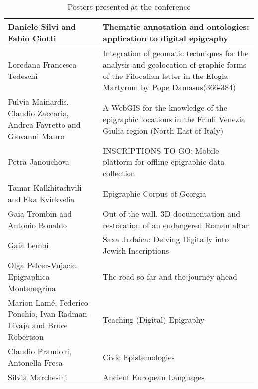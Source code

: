 \begin{table}
{\begin{tabular*}{\textwidth}{p{4.5cm}|p{6cm}}
Daniele Silvi and Fabio Ciotti & Thematic annotation and ontologies: application to digital epigraphy\\\hline
Loredana Francesca Tedeschi & Integration of geomatic techniques for the analysis and geolocation of graphic forms of the Filocalian letter in the Elogia Martyrum by Pope Damasus(366-384)\\\hline
Fulvia Mainardis, Claudio Zaccaria, Andrea Favretto and Giovanni Mauro & A WebGIS for the knowledge of the epigraphic locations in the Friuli Venezia Giulia region (North-East of Italy)\\\hline
Petra Janouchova & INSCRIPTIONS TO GO: Mobile platform for offline epigraphic data collection\\\hline
Tamar Kalkhitashvili and Eka Kvirkvelia & Epigraphic Corpus of Georgia\\\hline
Gaia Trombin and Antonio Bonaldo & Out of the wall. 3D documentation and restoration of an endangered Roman altar\\\hline
Gaia Lembi & Saxa Judaica: Delving Digitally into Jewish Inscriptions\\\hline
Olga Pelcer-Vujacic. Epigraphica Montenegrina & The road so far and the journey ahead\\\hline
Marion Lamé, Federico Ponchio, Ivan Radman-Livaja and Bruce Robertson & Teaching (Digital) Epigraphy\\\hline
Claudio Prandoni, Antonella Fresa & Civic Epistemologies \\\hline
Silvia Marchesini & Ancient European Languages \\
\bottomrule

\end{tabular*}}

\caption{Posters presented at the conference}
\label{tab:table2}
\end{table}